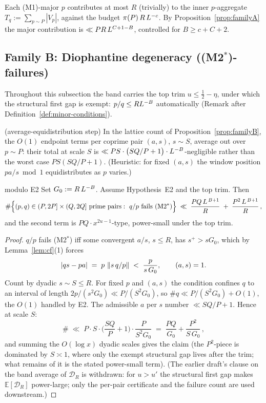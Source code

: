 \begin{remark}
Each (M1)-major $p$ contributes at most $R$ (trivially) to the inner
$p$-aggregate $T_q:=\sum_{p\sim P}|V_p|$, against the budget
$\pi(P)\,R\,L^{-c}$. By Proposition~\ref{prop:familyA} the major
contribution is $\ll PR\,L^{C+1-B}$, controlled for
$B\ge c+C+2$.
\end{remark}

\subsection{Family B: Diophantine degeneracy ((M2$^*$)-failures)}

Throughout this subsection the band carries the top trim
$u\le\tfrac12-\eta$, under which the structural first gap is exempt:
$p/q\le RL^{-B}$ automatically (Remark after
Definition~\ref{def:minor-conditions}).

\begin{hypothesis}\label{hyp:E2}
\statusO{} (average-equidistribution step)\quad
In the lattice count of Proposition~\ref{prop:familyB}, the $O(1)$
endpoint terms per coprime pair $(a,s)$, $s\sim S$, average out over
$p\sim P$: their total at scale $S$ is
$\ll PS\cdot\big(SQ/P+1\big)\cdot L^{-B}$-negligible rather than the
worst case $PS(SQ/P+1)$. (Heuristic: for fixed $(a,s)$ the window
position $pa/s\bmod1$ equidistributes as $p$ varies.)
\end{hypothesis}

\begin{proposition}\label{prop:familyB}
\statusP{} modulo E2\quad
Set $G_0:=R\,L^{-B}$. Assume Hypothesis~E2 and the top trim. Then
\[
\#\Big\{(p,q)\in(P,2P]\times(Q,2Q]\ \text{prime pairs}:\
q/p\ \text{fails (M2$^*$)}\Big\}
\;\ll\;\frac{PQ\,L^{\,B+1}}{R}
\;+\;\frac{P^{2}\,L^{\,B+1}}{R}\,,
\]
and the second term is $PQ\cdot x^{2u-1}$-type, power-small under the
top trim.
\end{proposition}

\begin{proof}
$q/p$ fails (M2$^*$) iff some convergent $a/s$, $s\le R$, has
$s^{+}>sG_0$, which by Lemma~\ref{lem:cf}(1) forces
\[
|qs-pa|\;=\;p\,\left\| s\,q/p\right\|\;<\;\frac{p}{s\,G_0},\qquad (a,s)=1 .
\]
Count by dyadic $s\sim S\le R$. For fixed $p$ and $(a,s)$ the condition
confines $q$ to an interval of length $2p/(s^2G_0)\ll P/(S^2G_0)$, so
$\#q\ll P/(S^2G_0)+O(1)$, the $O(1)$ handled by E2. The admissible $a$
per $s$ number $\ll SQ/P+1$. Hence at scale $S$:
\[
\#\;\ll\;P\cdot S\cdot\Big(\frac{SQ}P+1\Big)\cdot\frac{P}{S^{2}G_0}
\;=\;\frac{PQ}{G_0}+\frac{P^{2}}{S\,G_0}\,,
\]
and summing the $O(\log x)$ dyadic scales gives the claim (the
$P^2$-piece is dominated by $S\asymp1$, where only the exempt structural
gap lives after the trim; what remains of it is the stated power-small
term). (The earlier draft's clause on the band average of $\mathcal D_R$ is
withdrawn: for $u>u'$ the structural first gap makes
$\mathbb E[\mathcal D_R]$ power-large; only the per-pair certificate
and the failure count are used downstream.)
\end{proof}

